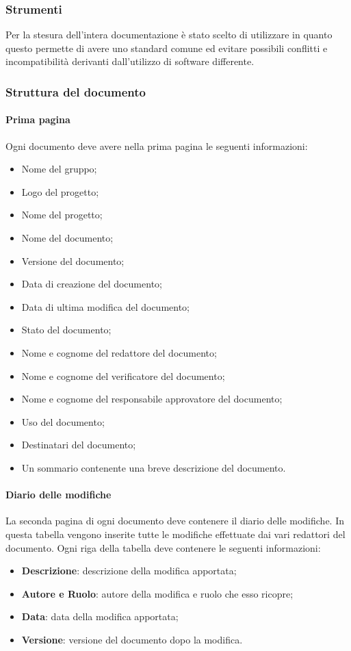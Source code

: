 \subsubsection{Strumenti}
Per la stesura dell'intera documentazione è stato scelto di utilizzare \textit{} in quanto questo  permette di avere uno
standard comune ed evitare possibili conflitti e incompatibilità derivanti
dall'utilizzo di software differente.

\subsubsection{Struttura del documento}
\paragraph{Prima pagina}
Ogni documento deve avere nella prima pagina le seguenti informazioni:
\begin{itemize}
  \item Nome del gruppo;
  \item Logo del progetto;
  \item Nome del progetto;
  \item Nome del documento;
  \item Versione del documento;
  \item Data di creazione del documento;
  \item Data di ultima modifica del documento;
  \item Stato del documento;
  \item Nome e cognome del redattore del documento;
  \item Nome e cognome del verificatore del documento;
  \item Nome e cognome del responsabile approvatore del documento;
  \item Uso del documento;
  \item Destinatari del documento;
  \item Un sommario contenente una breve descrizione del documento.
\end{itemize}

\paragraph{Diario delle modifiche}
La seconda pagina di ogni documento deve contenere il diario delle modifiche. In questa tabella vengono inserite tutte le modifiche effettuate dai vari redattori del documento. Ogni
riga della tabella deve contenere le seguenti informazioni:
\begin{itemize}
  \item \textbf{Descrizione}: descrizione della modifica apportata;
  \item \textbf{Autore e Ruolo}: autore della modifica e ruolo che esso ricopre;
  \item \textbf{Data}: data della modifica apportata;
  \item \textbf{Versione}: versione del documento dopo la modifica.
\end{itemize}

